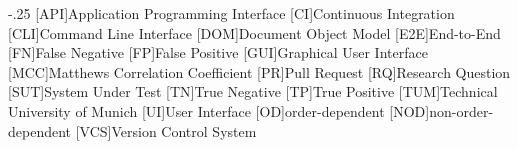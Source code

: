 
\begin{acronym}
    \itemsep-.25\baselineskip
    [API]{Application Programming Interface}
    [CI]{Continuous Integration}
    [CLI]{Command Line Interface}
    [DOM]{Document Object Model}
    [E2E]{End-to-End}
    [FN]{False Negative}
    [FP]{False Positive}
    [GUI]{Graphical User Interface}
    [MCC]{Matthews Correlation Coefficient}
    [PR]{Pull Request}
    [RQ]{Research Question}
    [SUT]{System Under Test}
    [TN]{True Negative}
    [TP]{True Positive}
    [TUM]{Technical University of Munich}
    [UI]{User Interface}
    [OD]{order-dependent}
    [NOD]{non-order-dependent}
    [VCS]{Version Control System}
\end{acronym}
